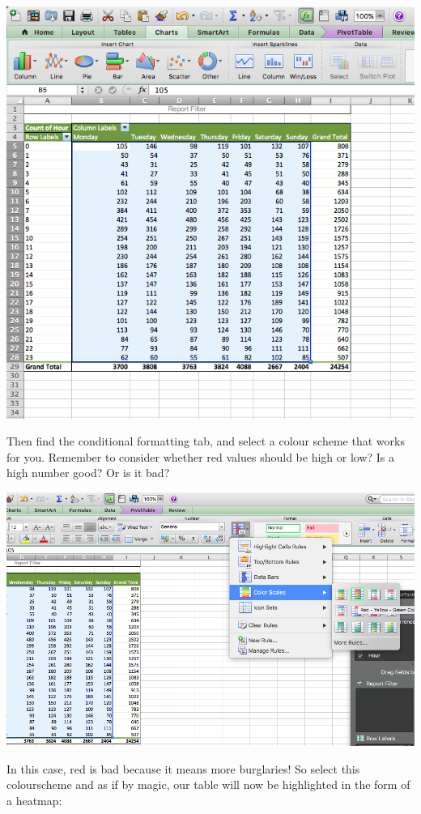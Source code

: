 \documentclass[]{book}
\theoremstyle{definition}
\theoremstyle{definition}
\theoremstyle{definition}
\theoremstyle{remark}
\begin{document}
\includegraphics{imgs/cond_1.png}

Then find the conditional formatting tab, and select a colour scheme
that works for you. Remember to consider whether red values should be
high or low? Is a high number good? Or is it bad?

\includegraphics{imgs/cond_2.png}

In this case, red is bad because it means more burglaries! So select
this colourscheme and as if by magic, our table will now be highlighted
in the form of a heatmap:
\end{document}
